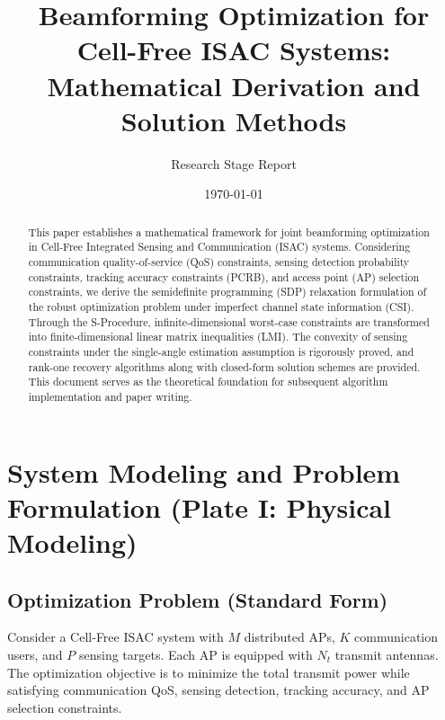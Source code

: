 \documentclass[12pt,a4paper]{article}
\title{\textbf{Beamforming Optimization for Cell-Free ISAC Systems: \\ Mathematical Derivation and Solution Methods}}
\author{Research Stage Report}
\date{\today}
\begin{document}
\maketitle

\begin{abstract}
This paper establishes a mathematical framework for joint beamforming optimization in Cell-Free Integrated Sensing and Communication (ISAC) systems. Considering communication quality-of-service (QoS) constraints, sensing detection probability constraints, tracking accuracy constraints (PCRB), and access point (AP) selection constraints, we derive the semidefinite programming (SDP) relaxation formulation of the robust optimization problem under imperfect channel state information (CSI). Through the S-Procedure, infinite-dimensional worst-case constraints are transformed into finite-dimensional linear matrix inequalities (LMI). The convexity of sensing constraints under the single-angle estimation assumption is rigorously proved, and rank-one recovery algorithms along with closed-form solution schemes are provided. This document serves as the theoretical foundation for subsequent algorithm implementation and paper writing.
\end{abstract}

\tableofcontents
\newpage

\section{System Modeling and Problem Formulation (Plate I: Physical Modeling)}

\subsection{Optimization Problem (Standard Form)}

Consider a Cell-Free ISAC system with $M$ distributed APs, $K$ communication users, and $P$ sensing targets. Each AP is equipped with $N_t$ transmit antennas. The optimization objective is to minimize the total transmit power while satisfying communication QoS, sensing detection, tracking accuracy, and AP selection constraints.
\end{document}
